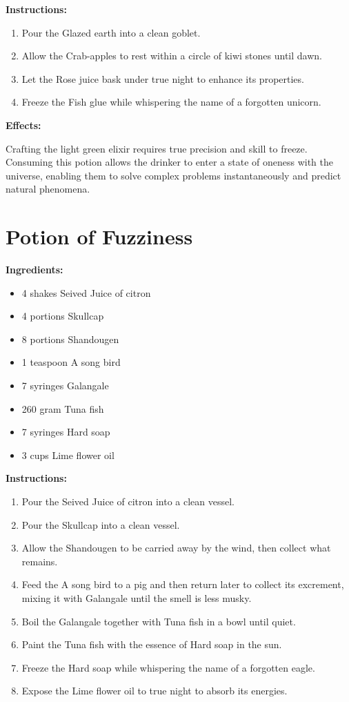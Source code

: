 \documentclass{article}
\begin{document}
\textbf{Instructions:}

\begin{enumerate}
  \item Pour the Glazed earth into a clean goblet.
  \item Allow the Crab-apples to rest within a circle of kiwi stones until dawn.
  \item Let the Rose juice bask under true night to enhance its properties.
  \item Freeze the Fish glue while whispering the name of a forgotten unicorn.
\end{enumerate}

\textbf{Effects:}

Crafting the light green elixir requires true precision and skill to freeze. Consuming this potion allows the drinker to enter a state of oneness with the universe, enabling them to solve complex problems instantaneously and predict natural phenomena.

\newpage
\section*{Potion of Fuzziness}

\textbf{Ingredients:}

\begin{itemize}
  \item 4 shakes Seived Juice of citron
  \item 4 portions Skullcap
  \item 8 portions Shandougen
  \item 1 teaspoon A song bird
  \item 7 syringes Galangale
  \item 260 gram Tuna fish
  \item 7 syringes Hard soap
  \item 3 cups Lime flower oil
\end{itemize}

\textbf{Instructions:}

\begin{enumerate}
  \item Pour the Seived Juice of citron into a clean vessel.
  \item Pour the Skullcap into a clean vessel.
  \item Allow the Shandougen to be carried away by the wind, then collect what remains.
  \item Feed the A song bird to a pig and then return later to collect its excrement, mixing it with Galangale until the smell is less musky.
  \item Boil the Galangale together with Tuna fish in a bowl until quiet.
  \item Paint the Tuna fish with the essence of Hard soap in the sun.
  \item Freeze the Hard soap while whispering the name of a forgotten eagle.
  \item Expose the Lime flower oil to true night to absorb its energies.
\end{enumerate}
\end{document}
